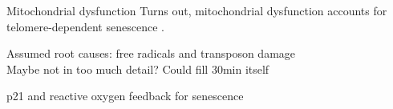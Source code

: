 \begin{frame}[c]{Mitochondrial dysfunction}
    \large
    Turns out, mitochondrial dysfunction accounts for telomere-dependent senescence \cite{passos2007mitochondrial}.
\end{frame}


\begin{frame}[c]
    \large
    Assumed root causes: free radicals and transposon damage \\
    Maybe not in too much detail? Could fill 30min itself \cite{CorePath13:online} \\
    \pause

    p21 and reactive oxygen feedback for senescence \cite{passos2010feedback}
\end{frame}

